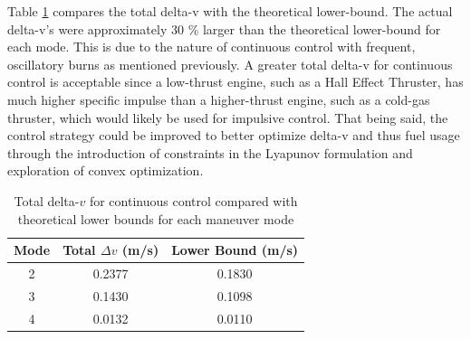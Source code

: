Table \ref{tab:dv_comparison_continuous} compares the total delta-v with the theoretical lower-bound. The actual delta-v's were approximately 30 \% larger than the theoretical lower-bound for each mode. This is due to the nature of continuous control with frequent, oscillatory burns as mentioned previously. A greater total delta-v for continuous control is acceptable since a low-thrust engine, such as a Hall Effect Thruster, has much higher specific impulse than a higher-thrust engine, such as a cold-gas thruster, which would likely be used for impulsive control. That being said, the control strategy could be improved to better optimize delta-v and thus fuel usage through the introduction of constraints in the Lyapunov formulation and exploration of convex optimization. 
\begin{table}[H]
\centering
\begin{tabular}{|c|c|c|}
\hline
\textbf{Mode} & \textbf{Total }$\Delta v$ \textbf{(m/s)} & \textbf{Lower Bound (m/s)} \\
\hline
2 & 0.2377 & 0.1830 \\
3 & 0.1430 & 0.1098 \\
4 & 0.0132 & 0.0110 \\
\hline
\end{tabular}
\caption{Total delta-$v$ for continuous control compared with theoretical lower bounds for each maneuver mode}
\label{tab:dv_comparison_continuous}
\end{table}

